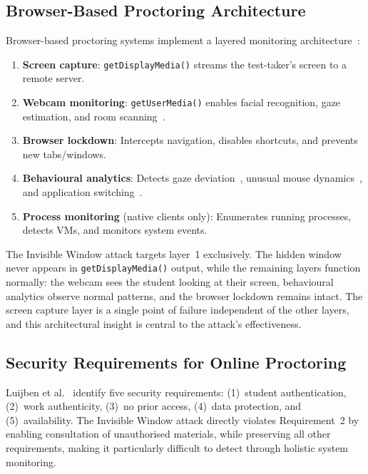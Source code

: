 \documentclass[conference]{IEEEtran}
\begin{document}
\subsection{Browser-Based Proctoring Architecture}

Browser-based proctoring systems implement a layered monitoring architecture~\cite{balash2023educators,balash2021examining,atoum2017automated}:

\begin{enumerate}
\item \textbf{Screen capture}: \texttt{getDisplayMedia()} streams the test-taker's screen to a remote server.
\item \textbf{Webcam monitoring}: \texttt{getUserMedia()} enables facial recognition, gaze estimation, and room scanning~\cite{kaddoura2023computational,ferdosi2023modeling}.
\item \textbf{Browser lockdown}: Intercepts navigation, disables shortcuts, and prevents new tabs/windows.
\item \textbf{Behavioural analytics}: Detects gaze deviation~\cite{ferdosi2023modeling}, unusual mouse dynamics~\cite{wang2020user,lyu2022befp,yazici2022online}, and application switching~\cite{atoum2017automated}.
\item \textbf{Process monitoring} (native clients only): Enumerates running processes, detects VMs, and monitors system events.
\end{enumerate}

The Invisible Window attack targets layer~1 exclusively. The hidden window never appears in \texttt{getDisplayMedia()} output, while the remaining layers function normally: the webcam sees the student looking at their screen, behavioural analytics observe normal patterns, and the browser lockdown remains intact. The screen capture layer is a single point of failure independent of the other layers, and this architectural insight is central to the attack's effectiveness.

\subsection{Security Requirements for Online Proctoring}

Luijben et al.~\cite{luijben2024security} identify five security requirements: (1)~student authentication, (2)~work authenticity, (3)~no prior access, (4)~data protection, and (5)~availability. The Invisible Window attack directly violates Requirement~2 by enabling consultation of unauthorised materials, while preserving all other requirements, making it particularly difficult to detect through holistic system monitoring.
\end{document}
